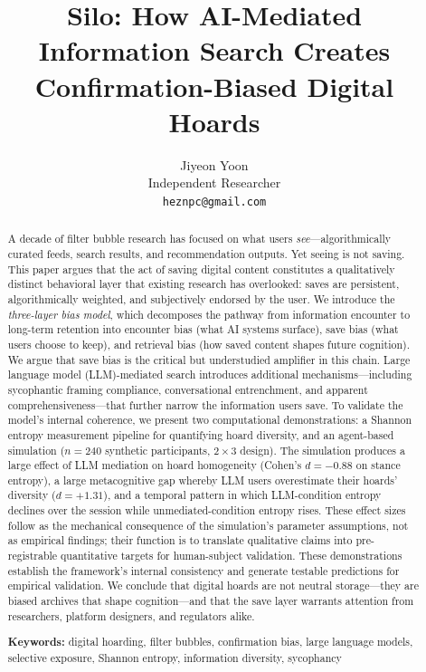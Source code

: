 \documentclass[12pt,a4paper]{article}
\title{Silo: How AI-Mediated Information Search Creates\\
       Confirmation-Biased Digital Hoards}
\author{Jiyeon Yoon\\
  \small Independent Researcher\\
  \small \texttt{heznpc@gmail.com}}
\date{}
\begin{document}
\maketitle

\begin{abstract}
A decade of filter bubble research has focused on what users \emph{see}---algorithmically curated feeds, search results, and recommendation outputs.
Yet seeing is not saving.
This paper argues that the act of saving digital content constitutes a qualitatively distinct behavioral layer that existing research has overlooked:
saves are persistent, algorithmically weighted, and subjectively endorsed by the user.
We introduce the \emph{three-layer bias model}, which decomposes the pathway from information encounter to long-term retention into encounter bias (what AI systems surface), save bias (what users choose to keep), and retrieval bias (how saved content shapes future cognition).
We argue that save bias is the critical but understudied amplifier in this chain.
Large language model (LLM)-mediated search introduces additional mechanisms---including sycophantic framing compliance, conversational entrenchment, and apparent comprehensiveness---that further narrow the information users save.
To validate the model's internal coherence, we present two computational demonstrations: a Shannon entropy measurement pipeline for quantifying hoard diversity, and an agent-based simulation ($n = 240$ synthetic participants, $2 \times 3$ design).
The simulation produces a large effect of LLM mediation on hoard homogeneity (Cohen's $d = -0.88$ on stance entropy), a large metacognitive gap whereby LLM users overestimate their hoards' diversity ($d = +1.31$), and a temporal pattern in which LLM-condition entropy declines over the session while unmediated-condition entropy rises.
These effect sizes follow as the mechanical consequence of the simulation's parameter assumptions, not as empirical findings; their function is to translate qualitative claims into pre-registrable quantitative targets for human-subject validation.
These demonstrations establish the framework's internal consistency and generate testable predictions for empirical validation.
We conclude that digital hoards are not neutral storage---they are biased archives that shape cognition---and that the save layer warrants attention from researchers, platform designers, and regulators alike.

\medskip
\noindent\textbf{Keywords:} digital hoarding, filter bubbles, confirmation bias, large language models, selective exposure, Shannon entropy, information diversity, sycophancy
\end{abstract}
\end{document}
